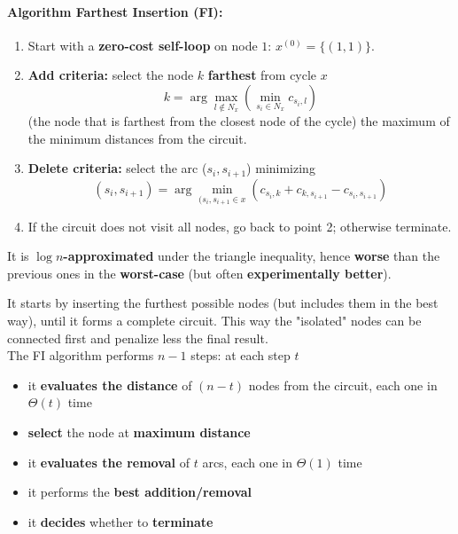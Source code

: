 \paragraph{Algorithm Farthest Insertion (FI):}
\begin{enumerate}
	\item Start with a \textbf{zero-cost self-loop} on node $1$: $x^{(0)} = \{(1, 1)\}$.\\
	
	\item \textbf{Add criteria:} select the node $k$ \textbf{farthest} from cycle $x$
	$$ k = \arg \max_{l \notin N_x} \left(\min_{s_i \in N_x} c_{s_i, l}\right) $$
	(the node that is farthest from the closest node of the cycle) the maximum of the minimum distances from the circuit.\\
	
	\item \textbf{Delete criteria:} select the arc ($s_i , s_{i+1}$) minimizing
	$$ (s_i, s_{i+1}) = \arg \min_{(s_i, s_{i+1} \in x} \left(c_{s_i, k} + c_{k, s_{i+1}} - c_{s_i, s_{i+1}} \right) $$
	
	\item If the circuit does not visit all nodes, go back to point 2; otherwise terminate.\\
\end{enumerate}

It is \textbf{$\log n$-approximated} under the triangle inequality, hence \textbf{worse} than the previous ones in the \textbf{worst-case} (but often \textbf{experimentally better}).\\

\newpage

It starts by inserting the furthest possible nodes (but includes them in the best way), until it forms a complete circuit. This way the "isolated" nodes can be connected first and penalize less the final result.\\

The FI algorithm performs $n - 1$ steps: at each step $t$
\begin{itemize}
	\item it \textbf{evaluates the distance} of $(n - t)$ nodes from the circuit, each one in $\Theta (t)$ time
	\item \textbf{select} the node at \textbf{maximum distance}
	\item it \textbf{evaluates the removal} of $t$ arcs, each one in $\Theta (1)$ time
	\item it performs the \textbf{best addition/removal}
	\item it \textbf{decides} whether to \textbf{terminate}
\end{itemize}

